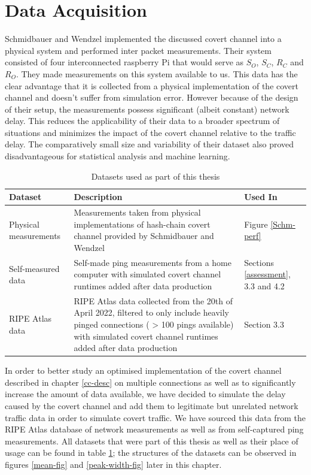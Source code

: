 \documentclass[12pt,a4paper,automark, toc=bib]{scrreprt}
\theoremstyle{definition}
\begin{document}
		\section{Data Acquisition}
			
			Schmidbauer and Wendzel  \cite{Schmidbauer2021, Schmidbauer} implemented the discussed covert channel into a physical system and performed inter packet measurements. Their system consisted of four interconnected raspberry Pi that would serve as $S_O$, $S_C$, $R_C$ and $R_O$. They made measurements on this system available to us. This data has the clear advantage that it is collected from a physical implementation of the covert channel and doesn't suffer from simulation error. However because of the design of their setup, the measurements possess significant (albeit constant) network delay. This reduces the applicability of their data to a broader spectrum of situations and minimizes the impact of the covert channel relative to the traffic delay. The comparatively small size and variability of their dataset also proved disadvantageous for statistical analysis and machine learning. \\
			\begin{table}
				\begin{tabular}{|m{4cm}|m{9cm}|m{2cm}|}
					\hline
					Dataset & Description & Used In \\
					\hline
					\hline
					Physical measurements &
					Measurements taken from physical implementations of hash-chain covert channel provided by Schmidbauer and Wendzel  \cite{Schmidbauer} &
					Figure \ref{Schm-perf}\\
					\hline
					Self-measured data &
					Self-made ping measurements from a home computer with simulated covert channel runtimes added after data production&
					Sections \ref{assessment}, 3.3 and 4.2\\ 
					\hline
					RIPE Atlas data&
					RIPE Atlas data \cite{RIPE} collected from the 20th of April 2022, filtered to only include heavily pinged connections ( > 100 pings available) with simulated covert channel runtimes added after data production &
					Section 3.3\\
					\hline
				\end{tabular}
				\caption{Datasets used as part of this thesis}
				\label{dataset-tab}
			\end{table}
			In order to better study an optimised implementation of the covert channel described in chapter \ref{cc-desc} on multiple connections as well as to significantly increase the amount of data available, we have decided to simulate the delay caused by the covert channel and add them to legitimate but unrelated network traffic data in order to simulate covert traffic.  We have sourced this data from the RIPE Atlas database of network measurements as well as from self-captured ping measurements. All datasets that were part of this thesis as well as their place of usage can be found in table \ref{dataset-tab}; the structures of the datasets can be observed in figures \ref{mean-fig} and \ref{peak-width-fig} later in this chapter.\\
\end{document}
